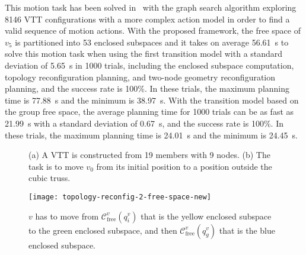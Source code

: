\documentclass[journal]{IEEEtran}
\begin{document}
This motion task has been solved in~\cite{Liu-vtt-planning-iros-2019}
with the graph search algorithm exploring 8146 VTT configurations with
a more complex action model in order to find a valid sequence of
motion actions. With the proposed framework, the free space of $v_5$
is partitioned into 53 enclosed subspaces and it takes on average
\SI{56.61}{s} to solve this motion task when using the first
transition model with a standard deviation of \SI{5.65}{s} in 1000
trials, including the enclosed subspace computation, topology
reconfiguration planning, and two-node geometry reconfiguration
planning, and the success rate is 100\%. In these trials, the maximum
planning time is \SI{77.88}{s} and the minimum is \SI{38.97}{s}. With
the transition model based on the group free space, the average
planning time for 1000 trials can be as fast as \SI{21.99}{s} with a
standard deviation of \SI{0.67}{s}, and the success rate is 100\%. In
these trials, the maximum planning time is \SI{24.01}{s} and the
minimum is \SI{24.45}{s}.

\begin{figure}[t]
  \centering
  \hfil
  \caption{(a) A VTT is constructed from 19 members with 9 nodes. (b)
    The task is to move $v_0$ from its initial position to a position
    outside the cubic truss.}
  \label{fig:topology-reconfig-task-2}
\end{figure}

\begin{figure}[t!]
  \centering
  \texttt{[image: topology-reconfig-2-free-space-new]}
  \caption{$v$ has to move from $\mathcal{C}_{\mathrm{free}}^v(q_i^v)$
    that is the yellow enclosed subspace to the green enclosed
    subspace, and then $\mathcal{C}_{\mathrm{free}}^v(q_g^v)$ that is
    the blue enclosed subspace.}
  \label{fig:topology-free-space-2}
\end{figure}
\end{document}
